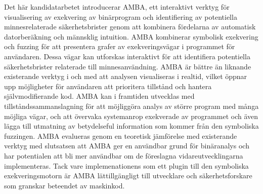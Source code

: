 Det här kandidatarbetet introducerar AMBA, ett interaktivt verktyg för visualisering av exekvering av binärprogram och identifiering av potentiella minnesrelaterade säkerhetsbrister genom att kombinera fördelarna av automatisk datorberäkning och männsklig intuition.
AMBA kombinerar symbolisk exekvering och fuzzing för att presentera grafer av exekveringsvägar i programmet för användaren.
Dessa vägar kan utforskas interaktivt för att identifiera potentiella säkerhetsbrister relaterade till minnesanvändning.
AMBA är bättre än liknande existerande verktyg i och med att analysen visualiseras i realtid, vilket öppnar upp möjligheter för användaren att prioritera tillstånd och hantera självmodifierande kod.
AMBA kan i framtiden utvecklas med tillståndssammanslagning för att möjliggöra analys av större program med många möjliga vägar, och att övervaka systemanrop exekverade av programmet och även lägga till utmatning av betydelseful information som kommer från den symboliska fuzzingen.
AMBA evalueras genom en teoretisk jämförelse med existerande verktyg med slutsatsen att AMBA ger en användbar grund för binäranalys och har potentialen att bli mer användbar om de föreslagna vidareutvecklingarna implementeras.
Tack vare implemenationens som ett plugin till den symboliska exekveringsmotorn \stoe{} är AMBA lättillgängligt till utvecklare och säkerhetsforskare som granskar beteendet av maskinkod.
